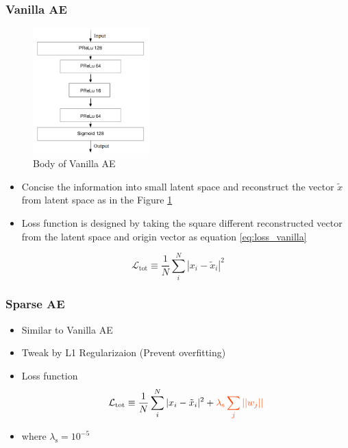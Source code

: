 \subsubsection{Vanilla AE}
\begin{figure}[h!]
    \centering
    \includegraphics[width=0.4\textwidth]{images/vanilla_ae.png}
    \caption{Body of Vanilla AE}
    \label{fig:vanilla_ae}
\end{figure}
\begin{itemize}
    \item Concise the information into small latent space and reconstruct the vector $\tilde{x}$ from latent space as in the Figure \ref{fig:vanilla_ae}
    \item Loss function is designed by taking the square different reconstructed vector from the latent space and origin vector as equation \ref{eq:loss_vanilla}
\end{itemize}
\begin{equation}\label{eq:loss_vanilla}
    \mathcal{L}_{\text{tot}} \equiv \frac{1}{N}\sum_i^N |x_i-\tilde{x}_i|^2
\end{equation}

\subsubsection{Sparse AE}
\begin{itemize}
    \item Similar to Vanilla AE
    \item Tweak by \textcolor[RGB]{255,69,0}{L1 Regularizaion (Prevent overfitting)}
    \item Loss function
    \begin{equation}
        \mathcal{L}_{\text{tot}} \equiv \frac{1}{N}\sum_i^N |x_i-\tilde{x}_i|^2 + \textcolor[RGB]{255,69,0}{\lambda_{\text{s}}\sum_j||w_j||}
    \end{equation}
    \item where $\lambda_{\text{s}} = 10^{-5}$
\end{itemize}

